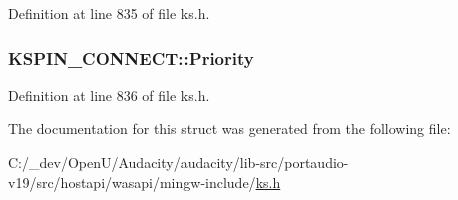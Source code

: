 Definition at line 835 of file ks.\+h.

\subsubsection[{\texorpdfstring{Priority}{Priority}}]{ K\+S\+P\+I\+N\+\_\+\+C\+O\+N\+N\+E\+C\+T\+::\+Priority}\hypertarget{struct_k_s_p_i_n___c_o_n_n_e_c_t_ac1719e3d12053516b9a1920d7fb1ff36}{}\label{struct_k_s_p_i_n___c_o_n_n_e_c_t_ac1719e3d12053516b9a1920d7fb1ff36}


Definition at line 836 of file ks.\+h.



The documentation for this struct was generated from the following file\+:\begin{DoxyCompactItemize}
\item 
C\+:/\+\_\+dev/\+Open\+U/\+Audacity/audacity/lib-\/src/portaudio-\/v19/src/hostapi/wasapi/mingw-\/include/\hyperlink{ks_8h}{ks.\+h}\end{DoxyCompactItemize}
